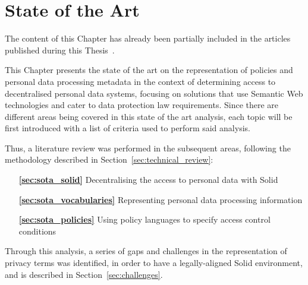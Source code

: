 \chapter{State of the Art}
\label{chap:sota}

\begin{tcolorbox}[colback=royallavender!40]
The content of this Chapter has already been partially included in the articles published during this Thesis~\citep{esteves_odrl_2021,esteves_analysis_2022,asgarinia_who_2023,esteves_using_2023,florea_is_2023}.
\end{tcolorbox}

This Chapter presents the state of the art on the representation of policies and personal data processing metadata in the context of determining access to decentralised personal data systems, focusing on solutions that use Semantic Web technologies and cater to data protection law requirements.
Since there are different areas being covered in this state of the art analysis, each topic will be first introduced with a list of criteria used to perform said analysis. 

Thus, a literature review was performed in the subsequent areas, following the methodology described in Section~\ref{sec:technical_review}:

\begin{itemize}
    \item [\textbf{\ref{sec:sota_solid}}] Decentralising the access to personal data with Solid
    \item [\textbf{\ref{sec:sota_vocabularies}}] Representing personal data processing information
    \item [\textbf{\ref{sec:sota_policies}}] Using policy languages to specify access control conditions
\end{itemize}

Through this analysis, a series of gaps and challenges in the representation of privacy terms was identified, in order to have a legally-aligned Solid environment, and is described in Section~\ref{sec:challenges}.




